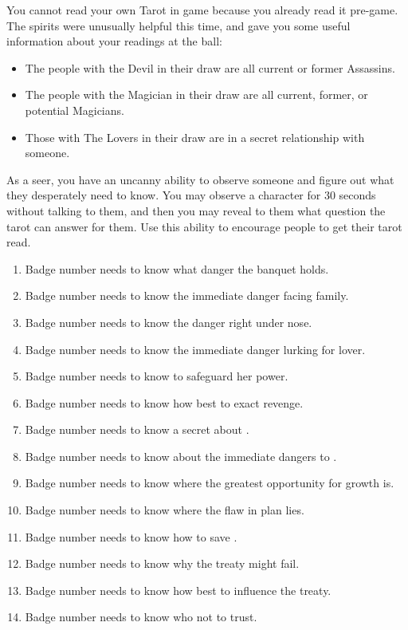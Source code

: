 \documentclass[green]{NeptuneBall}
\begin{document}
You cannot read your own Tarot in game because you already read it pre-game. The spirits were unusually helpful this time, and gave you some useful information about your readings at the ball:

\begin{itemize}
\item The people with the Devil in their draw are all current or former Assassins.
\item The people with the Magician in their draw are all current, former, or potential Magicians.
\item Those with The Lovers in their draw are in a secret relationship with someone.
\end{itemize}

\newpage
As a seer, you have an uncanny ability to observe someone and figure out what they desperately need to know.  You may observe a character for 30 seconds without talking to them, and then you may reveal to them what question the tarot can answer for them. Use this ability to encourage people to get their tarot read.

\begin{enumerate}
	\item Badge number \cPlant{\MYnumber} needs to know what danger the banquet holds.
	\item Badge number \cKing{\MYnumber} needs to know the immediate danger facing \cKing{\their} family.
	\item Badge number \cQueen{\MYnumber} needs to know the danger right under \cQueen{\their} nose.
	\item Badge number \cGeneral{\MYnumber} needs to know the immediate danger lurking for \cGeneral{\their} lover.
	\item Badge number \cWitch{\MYnumber} needs to know to safeguard her power.
	\item Badge number \cPriest{\MYnumber} needs to know how best to exact revenge.
	\item Badge number \cPrincess{\MYnumber} needs to know a secret about \cPrincess{\their} \cAthena{\parent}.
	\item Badge number \cAriel{\MYnumber} needs to know about the immediate dangers to \pAtlantis{}.
	\item Badge number \cWillow{\MYnumber} needs to know where the greatest opportunity for growth is.
	\item Badge number \cManta{\MYnumber} needs to know where the flaw in \cManta{\their} plan lies.
	\item Badge number \cBodyguard{\MYnumber} needs to know how to save \pPacifica{}.
	\item Badge number \cPrince{\MYnumber} needs to know why the treaty might fail.
	\item Badge number \cSpy{\MYnumber} needs to know how best to influence the treaty.
	\item Badge number \cDiplomat{\MYnumber} needs to know who not to trust.
\end{enumerate}
\end{document}
